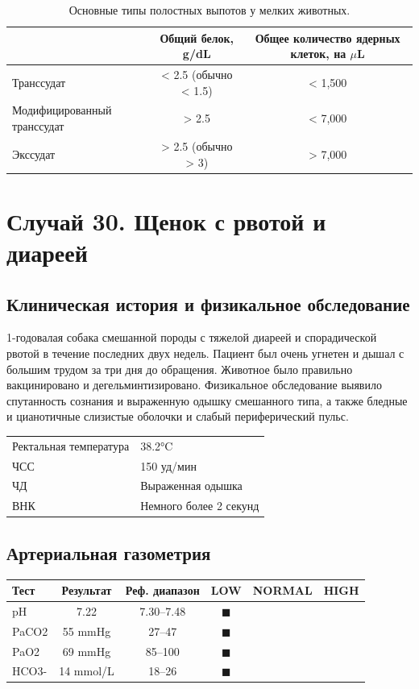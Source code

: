 \documentclass[a4paper,12pt]{book}
\begin{document}
\begin{table}[htbp]
\centering
\caption{Основные типы полостных выпотов у мелких животных.}
\begin{tabular}{lcc}
\toprule
& Общий белок, g/dL & Общее количество ядерных клеток, на $\mu$L \\
\midrule
Транссудат & < 2.5 (обычно < 1.5) & < 1,500 \\
Модифицированный транссудат & > 2.5 & < 7,000 \\
Экссудат & > 2.5 (обычно > 3) & > 7,000 \\
\bottomrule
\end{tabular}
\end{table}

\section{Случай 30. Щенок с рвотой и диареей}
\subsection*{Клиническая история и физикальное обследование}
1-годовалая собака смешанной породы с тяжелой диареей и спорадической рвотой в течение последних двух недель. Пациент был очень угнетен и дышал с большим трудом за три дня до обращения. Животное было правильно вакцинировано и дегельминтизировано. Физикальное обследование выявило спутанность сознания и выраженную одышку смешанного типа, а также бледные и цианотичные слизистые оболочки и слабый периферический пульс.

\begin{tabular}{@{}ll@{}}
\toprule
Ректальная температура & 38.2°C \\
ЧСС & 150 уд/мин \\
ЧД & Выраженная одышка \\
ВНК & Немного более 2 секунд \\
\bottomrule
\end{tabular}

\subsection*{Артериальная газометрия}
\begin{tabular}{lccccc}
\toprule
Тест & Результат & Реф. диапазон & LOW & NORMAL & HIGH \\
\midrule
pH & 7.22 & 7.30--7.48 & $\blacksquare$ \\
PaCO2 & 55 mmHg & 27--47 & $\blacksquare$ \\
PaO2 & 69 mmHg & 85--100 & $\blacksquare$ \\
HCO3- & 14 mmol/L & 18--26 & $\blacksquare$ \\
\bottomrule
\end{tabular}
\end{document}

